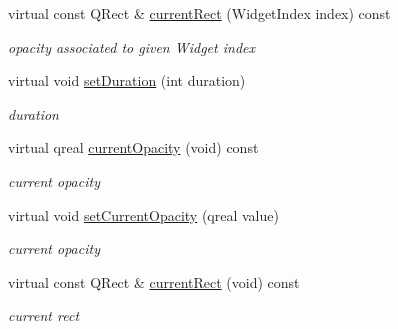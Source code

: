 \begin{DoxyCompactItemize}
\mbox{\label{class_menu_bar_data_v1_adafa4c6b5b9af5d8dbe06f765139e365}} 
virtual const Q\+Rect \& \hyperlink{class_menu_bar_data_v1_adafa4c6b5b9af5d8dbe06f765139e365}{current\+Rect} (Widget\+Index index) const
\begin{DoxyCompactList}\small\item\em opacity associated to given Widget index \end{DoxyCompactList}\item 
\mbox{\label{class_menu_bar_data_v1_a850f44bc025e43fc98f7613441f46a81}} 
virtual void \hyperlink{class_menu_bar_data_v1_a850f44bc025e43fc98f7613441f46a81}{set\+Duration} (int duration)
\begin{DoxyCompactList}\small\item\em duration \end{DoxyCompactList}\item 
\mbox{\label{class_menu_bar_data_v1_a343599366d402e5ed4882af7917ef0fb}} 
virtual qreal \hyperlink{class_menu_bar_data_v1_a343599366d402e5ed4882af7917ef0fb}{current\+Opacity} (void) const
\begin{DoxyCompactList}\small\item\em current opacity \end{DoxyCompactList}\item 
\mbox{\label{class_menu_bar_data_v1_acc5f2a69c816e6df270a828ae0ef079c}} 
virtual void \hyperlink{class_menu_bar_data_v1_acc5f2a69c816e6df270a828ae0ef079c}{set\+Current\+Opacity} (qreal value)
\begin{DoxyCompactList}\small\item\em current opacity \end{DoxyCompactList}\item 
\mbox{\label{class_menu_bar_data_v1_a9fcf3d042f9e9347bcafcac0e9bd0b65}} 
virtual const Q\+Rect \& \hyperlink{class_menu_bar_data_v1_a9fcf3d042f9e9347bcafcac0e9bd0b65}{current\+Rect} (void) const
\begin{DoxyCompactList}\small\item\em current rect \end{DoxyCompactList}\item 
\mbox{\label{class_menu_bar_data_v1_a70a71c4f5cb0dbe694677add331c4637}} 

\end{DoxyCompactItemize}
